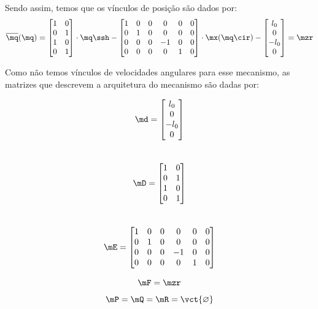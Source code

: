 \documentclass[]{politex}
\begin{document}
\begin{itemize}
Sendo assim, temos que os vínculos de posição são dados por:
\begin{equation}
\overline{\mq}(\mq) =
\begin{bmatrix}
1 & 0 \\
0 & 1 \\
1 & 0 \\
0 & 1 \\
\end{bmatrix}
\cdot
\mq\ssh
-
\begin{bmatrix}
1 & 0 & 0 & 0 & 0 & 0 \\
0 & 1 & 0 & 0 & 0 & 0 \\
0 & 0 & 0 & -1 & 0 & 0 \\
0 & 0 & 0 & 0 & 1 & 0 \\
\end{bmatrix}
\cdot
\mx(\mq\cir)
-
\begin{bmatrix}
l_0 \\
0 \\
-l_0 \\
0 \\
\end{bmatrix}
= \mzr
\end{equation}

Como não temos vínculos de velocidades angulares para esse mecanismo, as matrizes que descrevem a arquitetura do mecanismo são dadas por:
\begin{multicols}{3}
\begin{equation}
\md = \begin{bmatrix}
l_0 \\
0 \\
-l_0 \\
0 \\
\end{bmatrix}
\end{equation} \\
\begin{equation}
\mD = \begin{bmatrix}
1 & 0 \\
0 & 1 \\
1 & 0 \\
0 & 1 \\
\end{bmatrix}
\end{equation} \\
\begin{equation}
\mE = \begin{bmatrix}
1 & 0 & 0 & 0 & 0 & 0 \\
0 & 1 & 0 & 0 & 0 & 0 \\
0 & 0 & 0 & -1 & 0 & 0 \\
0 & 0 & 0 & 0 & 1 & 0 \\
\end{bmatrix}
\end{equation}
\end{multicols}
\begin{equation}
\mF = \mzr
\end{equation}
\begin{equation}
\mP = \mQ = \mR = \vct{\varnothing}
\end{equation}


\end{itemize}
\end{document}
